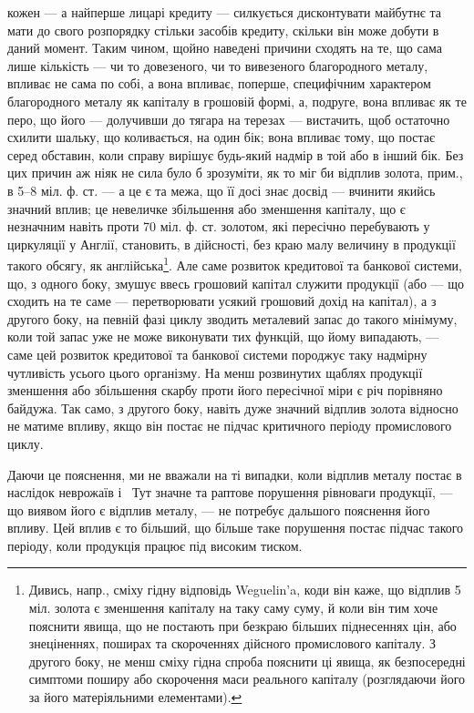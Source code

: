 \parcont{}  %
кожен — а найперше лицарі кредиту — силкується дисконтувати майбутнє та
мати до свого розпорядку стільки засобів кредиту, скільки він може добути в
даний момент. Таким чином, щойно наведені причини сходять на те, що сама
лише кількість — чи то довезеного, чи то вивезеного благородного металу, впливає
не сама по собі, а вона впливає, поперше, специфічним характером благородного
металу як капіталу в грошовій формі, а, подруге, вона впливає як те перо,
що його — долучивши до тягара на терезах — вистачить, щоб остаточно схилити
шальку, що коливається, на один бік; вона впливає тому, що постає серед
обставин, коли справу вирішує будь-який надмір в той або в інший бік. Без цих
причин аж ніяк не сила було б зрозуміти, як то міг би відплив золота, прим.,
в 5--8 міл. ф. ст. — а це є та межа, що її досі знає досвід — вчинити якийсь
значний вплив; це невеличке збільшення або зменшення капіталу, що є незначним
навіть проти 70 міл. ф. ст. золотом, які пересічно перебувають у циркуляції
у Англії, становить, в дійсності, без краю малу величину в продукції такого
обсягу, як англійська\footnote{
Дивись, напр., сміху гідну відповідь Weguelin’a, коди він каже, що відплив 5 міл. золота
є зменшення капіталу на таку саму суму, й коли він тим хоче пояснити явища, що не постають при
безкраю
більших піднесеннях цін, або знеціненнях, поширах та скороченнях дійсного промислового капіталу.
З другого боку, не менш сміху гідна спроба пояснити ці явища, як безпосередні симптоми поширу або
скорочення маси реального капіталу (розглядаючи його за його матеріяльними елементами).
}. Але саме розвиток кредитової та банкової системи, що,
з одного боку, змушує ввесь грошовий капітал служити продукції (або — що
сходить на те саме — перетворювати усякий грошовий дохід на капітал), а з
другого боку, на певній фазі циклу зводить металевий запас до такого мінімуму,
коли той запас уже не може виконувати тих функцій, що йому випадають, —
саме цей розвиток кредитової та банкової системи породжує таку надмірну чутливість
усього цього організму. На менш розвинутих щаблях продукції зменшення
або збільшення скарбу проти його пересічної міри є річ порівняно байдужа.
Так само, з другого боку, навіть дуже значний відплив золота відносно
не матиме впливу, якщо він постає не підчас критичного періоду промислового
циклу.

Даючи це пояснення, ми не вважали на ті випадки, коли відплив металу
постає в наслідок неврожаїв і~ Тут значне та раптове порушення рівноваги
продукції, — що виявом його є відплив металу, — не потребує дальшого пояснення
його впливу. Цей вплив є то більший, що більше таке порушення постає
підчас такого періоду, коли продукція працює під високим тиском.

